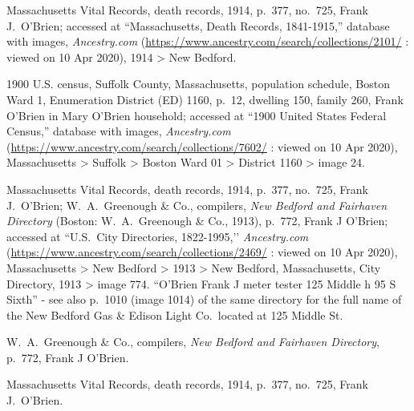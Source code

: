 \begin{thebibliography}{999}
Massachusetts Vital Records, death records, 1914, p.\ 377, no.\ 725, Frank J.\ O'Brien; accessed at ``Massachusetts, Death Records, 1841-1915,'' database with images, \textit{Ancestry.com} (\url{https://www.ancestry.com/search/collections/2101/} : viewed on 10 Apr 2020), 1914 > New Bedford.

1900 U.S. census, Suffolk County, Massachusetts, population schedule, Boston Ward 1, Enumeration District (ED) 1160, p.\ 12, dwelling 150, family 260, Frank O'Brien in Mary O'Brien household; accessed at ``1900 United States Federal Census,'' database with images, \textit{Ancestry.com} (\url{https://www.ancestry.com/search/collections/7602/} : viewed on 10 Apr 2020), Massachusetts > Suffolk > Boston Ward 01 > District 1160 > image 24.

Massachusetts Vital Records, death records, 1914, p.\ 377, no.\ 725, Frank J.\ O'Brien; W.\ A.\ Greenough \& Co., compilers, \textit{New Bedford and Fairhaven Directory} (Boston: W.\ A.\ Greenough \& Co., 1913), p.\ 772, Frank J O'Brien; accessed at ``U.S.\ City Directories, 1822-1995,’’ \textit{Ancestry.com} (\url{https://www.ancestry.com/search/collections/2469/} : viewed on 10 Apr 2020), Massachusetts > New Bedford > 1913 > New Bedford, Massachusetts, City Directory, 1913 > image 774. ``O'Brien Frank J meter tester 125 Middle h 95 S Sixth'' - see also p.\ 1010 (image 1014) of the same directory for the full name of the New Bedford Gas \& Edison Light Co.\ located at 125 Middle St.

W.\ A.\ Greenough \& Co., compilers, \textit{New Bedford and Fairhaven Directory}, p.\ 772, Frank J O'Brien.

Massachusetts Vital Records, death records, 1914, p.\ 377, no.\ 725, Frank J.\ O'Brien.
	
\end{thebibliography}